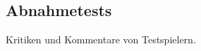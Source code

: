 %



\newpage



\subsection*{Abnahmetests}
\label{Abschnitt:Tests:Protokoll:Abnahme}

Kritiken und Kommentare von Testspielern.





